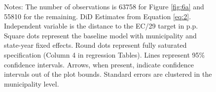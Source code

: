 \begin{figure}[h!]
\begin{center}
    \end{center}
    \scriptsize{Notes: The number of observations is 63758 for Figure \ref{fig:6a} and 55810 for the remaining. DiD Estimates from Equation \ref{eq:2}. Independent variable is the distance to the EC/29 target in p.p. Square dots represent the baseline model with municipality and state-year fixed effects. Round dots represent fully saturated specification (Column 4 in regression Tables). Lines represent 95\% confidence intervals. Arrows, when present, indicate confidence intervals out of the plot bounds. Standard errors are clustered in the municipality level.}
    
\end{figure}